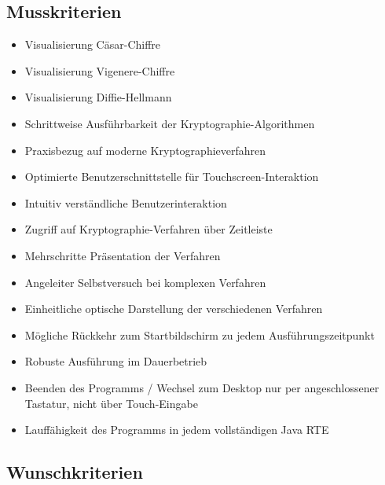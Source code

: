 \documentclass{article}
\begin{document}
\subsection{Musskriterien}

\begin{itemize}
    \item Visualisierung Cäsar-Chiffre
    \item Visualisierung Vigenere-Chiffre
    \item Visualisierung Diffie-Hellmann
    \item Schrittweise Ausführbarkeit der Kryptographie-Algorithmen
    \item Praxisbezug auf moderne Kryptographieverfahren
    \item Optimierte \gls{Benutzerschnittstelle} für Touchscreen-Interaktion
    \item Intuitiv verständliche Benutzerinteraktion
    \item Zugriff auf Kryptographie-Verfahren über Zeitleiste
    \item Mehrschritte Präsentation der Verfahren
    \item Angeleiter Selbstversuch bei komplexen Verfahren
    \item Einheitliche optische Darstellung der verschiedenen Verfahren
    \item Mögliche Rückkehr zum Startbildschirm zu jedem Ausführungszeitpunkt
    \item Robuste Ausführung im Dauerbetrieb
    \item Beenden des Programms / Wechsel zum Desktop nur per angeschlossener Tastatur, nicht über Touch-Eingabe
    \item Lauffähigkeit des Programms in jedem vollständigen Java RTE
\end{itemize}

\subsection{Wunschkriterien}
\end{document}
